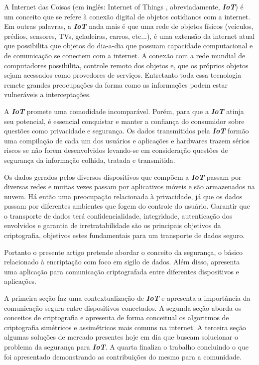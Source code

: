 \documentclass[12pt]{article}
\begin{document}
A Internet das Coisas (em inglês: Internet of Things , abreviadamente, \textbf{\textit{IoT}}) é um conceito que se refere à conexão digital de objetos cotidianos com a internet. Em outras palavras, a \textbf{\textit{IoT}} nada mais é que uma rede de objetos físicos (veículos, prédios, sensores, TVs, geladeiras, carros, etc...), é uma extensão da internet atual que possibilita que objetos do dia-a-dia que possuam capacidade computacional e de comunicação se conectem com a internet. A conexão com a rede mundial de computadores possibilita, controle remoto dos objetos e, que os próprios objetos sejam acessados como provedores de serviços. Entretanto toda essa tecnologia remete grandes preocupações da forma como as informações podem estar vulneráveis a interceptações. 


A \textbf{\textit{IoT}} promete uma comodidade incomparável. Porém, para que a \textbf{\textit{IoT}} atinja seu potencial, é essencial conquistar e manter a confiança do consumidor sobre questões como privacidade e segurança. Os dados transmitidos pela \textbf{\textit{IoT}} formão uma compilação de cada um dos usuários e aplicações e hardwares trazem sérios riscos se não forem desenvolvidos levando-se em consideração questões de segurança da informação colhida, tratada e transmitida.


Os dados gerados pelos diversos dispositivos que compõem a \textbf{\textit{IoT}} passam por diversas redes e muitas vezes passam por aplicativos móveis e são armazenados na nuvem. Há então uma preocupação relacionada à privacidade, já que os dados passam por diferentes ambientes que fogem do controle do usuário. Garantir que o transporte de dados terá confidencialidade, integridade, autenticação dos envolvidos e garantia de irretratabilidade são os principais objetivos da criptografia, objetivos estes fundamentais para um transporte de dados seguro.


Portanto o presente artigo pretende abordar o conceito da segurança, o básico relacionado à encriptação com foco em sigilo de dados. Além disso, apresenta uma aplicação para comunicação criptografada entre diferentes dispositivos e aplicações.

A primeira seção faz uma contextualização de \textbf{\textit{IoT}} e apresenta a importância da comunicação segura entre dispositivos conectados. A segunda seção aborda os conceitos de criptografia e apresenta de forma conceitual os algoritmos de criptografia simétricos e assimétricos mais comuns na internet. A terceira seção algumas soluções de mercado presentes hoje em dia que buscam solucionar o problema da segurança para \textbf{\textit{IoT}}. A quarta finaliza o trabalho concluindo o que foi apresentado demonstrando as contribuições do mesmo para a comunidade.
\end{document}
